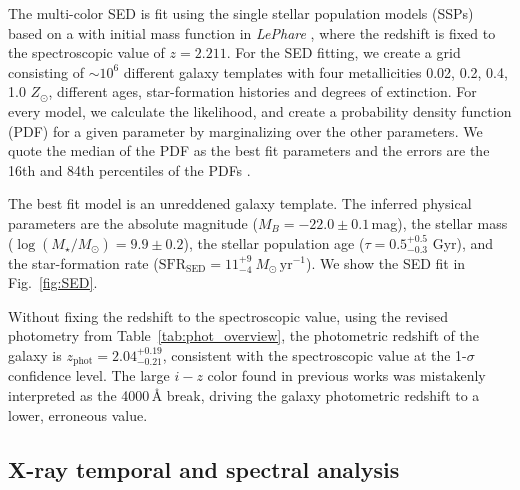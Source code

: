 \documentclass[referee]{aa}
\begin{document}


The multi-color SED is fit using the \citet{Bruzual2003} single stellar
population models (SSPs) based on a \citet{Chabrier2003} with initial mass
function in \emph{LePhare} \citep{Ilbert2006}, where the redshift is fixed to
the spectroscopic value of $z=2.211$. For the SED fitting, we create a grid
consisting of $\sim 10^6$  different galaxy templates with four metallicities
0.02, 0.2, 0.4, 1.0 $Z_{\odot}$, different ages, star-formation histories and
degrees of extinction. For every model, we calculate the likelihood, and create
a probability density function (PDF) for a given parameter by marginalizing over
the other parameters. We quote the median of the PDF as the best fit parameters
and the errors are the 16th and 84th percentiles of the PDFs \citep[e.g.
see][for details on the SED fitting procedure]{Schulze2016}.

The best fit model is an unreddened galaxy template. The inferred physical
parameters are the absolute magnitude ($M_B=-22.0\pm0.1$\,mag), the stellar mass
($\log(M_{\star}/M_\odot) = 9.9\pm0.2$), the stellar population age ($\tau =
0.5_{-0.3}^{+0.5}$ Gyr), and the star-formation rate
($\mathrm{SFR}_{\mathrm{SED}} = 11_{-4}^{+9}~M_\odot\,\mathrm{yr}^{-1}$). We
show the SED fit in Fig.~\ref{fig:SED}.

Without fixing the redshift to the spectroscopic value, using the revised
photometry from Table~\ref{tab:phot_overview}, the photometric redshift of the
galaxy is $z_{\mathrm{phot}}=2.04_{-0.21}^{+0.19}$, consistent with the
spectroscopic value at the 1-$\sigma$ confidence level. The large $i-z$ color
found in previous works was mistakenly interpreted as the 4000\,\AA{} break,
driving the galaxy photometric redshift to a lower, erroneous value.

\subsection{X-ray temporal and spectral analysis}\label{xray}
\end{document}
